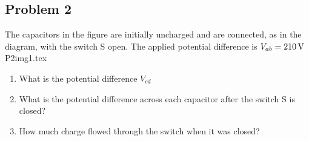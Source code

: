 \subsection*{Problem 2}
The capacitors in the figure are initially uncharged
and are connected, as in the diagram, with the
switch S open. The applied potential difference is $V_{ab}=210\,\mathrm{V}$\\
{P2img1.tex}
\begin{enumerate}
    \item What is the potential difference $V_{cd}$
    \item What is the potential difference across each
    capacitor after the switch S is closed?
    \item How much charge flowed through the switch
    when it was closed?
\end{enumerate}

